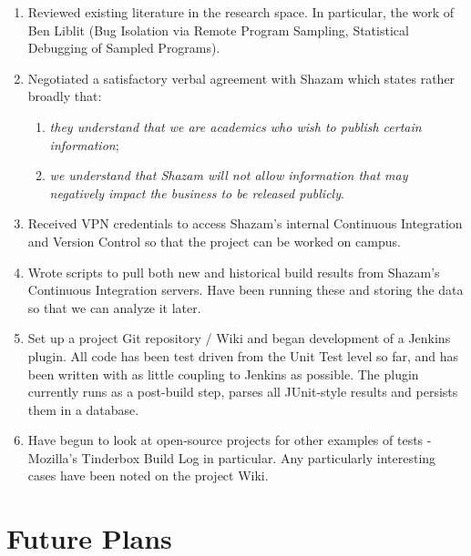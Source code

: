 \begin{enumerate}

	\item Reviewed existing literature in the research space. In particular, the
	work of Ben Liblit (Bug Isolation via Remote Program Sampling, Statistical
	Debugging of Sampled Programs).
	\item Negotiated a satisfactory verbal agreement with Shazam which states
	rather broadly that:
		\begin{enumerate}

			\item{\itshape they understand that we are academics who wish to publish
			certain information};
			\item {\itshape we understand that Shazam will not allow information that
			may negatively impact the business to be released publicly}.

		\end{enumerate}
	\item Received VPN credentials to access Shazam's internal Continuous
	Integration and Version Control so that the project can be worked on campus.
	\item Wrote scripts to pull both new and historical build results from
	Shazam's Continuous Integration servers. Have been running these and storing
	the data so that we can analyze it later.
	\item Set up a project Git repository / Wiki and began development of a
	Jenkins plugin. All code has been test driven from the Unit Test level so far,
	and has been written with as little coupling to Jenkins as possible. The
	plugin currently runs as a post-build step, parses all JUnit-style results and
	persists them in a database.
	\item Have begun to look at open-source projects for other examples of \flaky
	tests - Mozilla's Tinderbox Build Log in particular. Any particularly
	interesting cases have been noted on the project Wiki.

\end{enumerate}

\newpage

\tocless\section{Future Plans}


